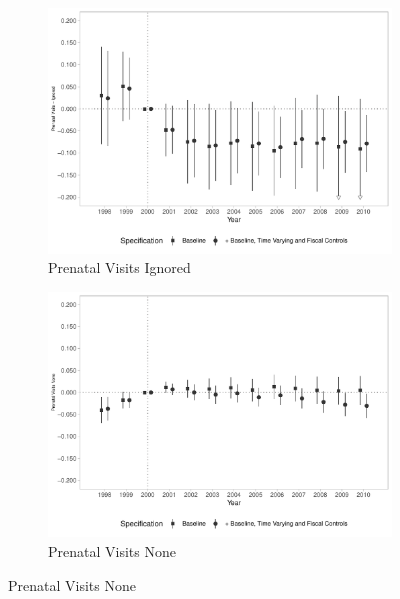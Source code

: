 \begin{figure}[h!]
    \begin{center}
    \caption{Effects on Access to Health Services}\label{fig:13}
    \begin{subfigure}{0.48\textwidth}
        \caption{\scriptsize Prenatal Visits Ignored}\label{fig:13a}
        \centering
        \includegraphics[width=\textwidth]{plots/birth_prenat_ig_dist_ec29_baseline_dist_ec29_baseline_13.pdf}
    \end{subfigure}
    \begin{subfigure}{0.48\textwidth}
        \caption{\scriptsize Prenatal Visits None}\label{fig:13b}
        \centering
        \includegraphics[width=\textwidth]{plots/birth_prenat_0_dist_ec29_baseline_dist_ec29_baseline_13.pdf}
    \end{subfigure}

\end{center}
\end{figure}
